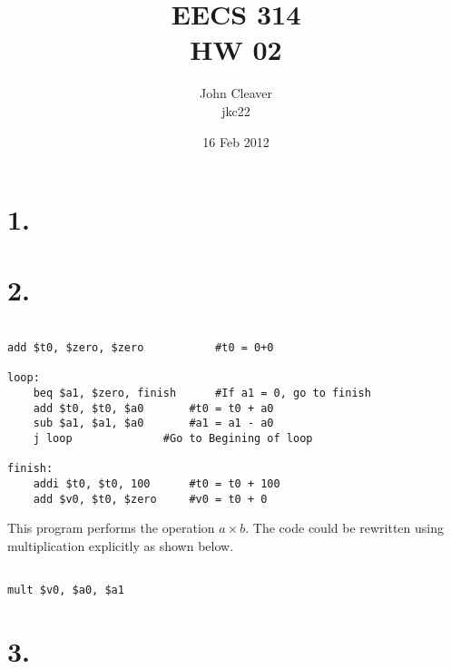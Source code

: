 \documentclass[12pt]{article}
\title{EECS 314 \\ HW 02}
\author{John Cleaver \\ jkc22}
\date{16 Feb 2012}
\begin{document}
\lstset{language=[mips]Assembler}
\maketitle

\section*{1.}



\section*{2.}

\begin{lstlisting}

add $t0, $zero, $zero 			#t0 = 0+0

loop:
	beq $a1, $zero, finish 		#If a1 = 0, go to finish
	add $t0, $t0, $a0 		#t0 = t0 + a0
	sub $a1, $a1, $a0 		#a1 = a1 - a0
	j loop				#Go to Begining of loop

finish:
	addi $t0, $t0, 100		#t0 = t0 + 100
	add $v0, $t0, $zero		#v0 = t0 + 0

\end{lstlisting}

This program performs the operation $a \times b$. The code could be rewritten using multiplication explicitly as shown below.

\begin{lstlisting}

mult $v0, $a0, $a1

\end{lstlisting}

\section*{3.}
\end{document}
